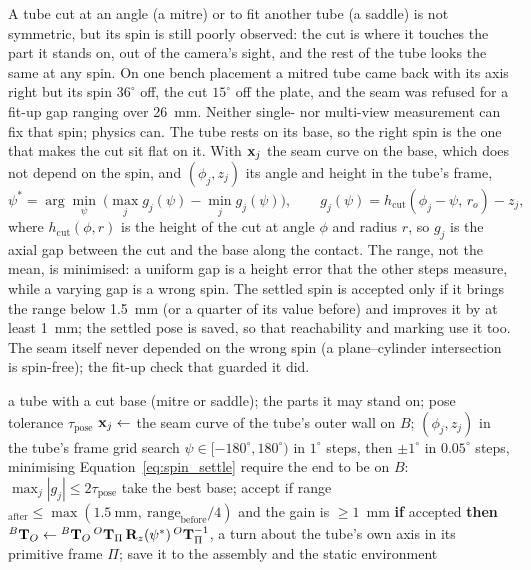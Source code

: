 A tube cut at an angle (a mitre) or to fit another tube (a saddle) is not symmetric, but its spin is
still poorly observed: the cut is where it touches the part it stands on, out of the camera's sight,
and the rest of the tube looks the same at any spin. On one bench placement a mitred tube came back
with its axis right but its spin $36^\circ$ off, the cut $15^\circ$ off the plate, and the seam was
refused for a fit-up gap ranging over 26~mm. Neither single- nor multi-view measurement can fix
that spin; physics can. The tube rests on its base, so the right spin is the one that makes the cut
sit flat on it. With $\mathbf{x}_j$ the seam curve on the base, which does not depend on the spin, and
$(\phi_j,z_j)$ its angle and height in the tube's frame,
\begin{equation}
\psi^{*} = \arg\min_{\psi}\ \Big(\max_{j} g_j(\psi) - \min_{j} g_j(\psi)\Big),
\qquad g_j(\psi)=h_{\mathrm{cut}}(\phi_j-\psi,\,r_o)-z_j,
\label{eq:spin_settle}
\end{equation}
where $h_{\mathrm{cut}}(\phi,r)$ is the height of the cut at angle $\phi$ and radius $r$, so
$g_j$ is the axial gap between the cut and the base along the contact. The range, not the mean, is
minimised: a uniform gap is a height error that the other steps measure, while a varying gap is a
wrong spin. The settled spin is accepted only if it brings the range below 1.5~mm (or a quarter of
its value before) and improves it by at least 1~mm; the settled pose is saved, so that reachability
and marking use it too. The seam itself never depended on the wrong spin (a plane--cylinder
intersection is spin-free); the fit-up check that guarded it did.

\begin{algorithm}[htbp]
\caption{Settling the spin of a cut tube on what it stands on}
\label{alg:spin_settle}
\begin{algorithmic}[1]
\REQUIRE a tube with a cut base (mitre or saddle); the parts it may stand on; pose tolerance $\tau_{\mathrm{pose}}$
  \STATE $\mathbf{x}_j\gets$ the seam curve of the tube's outer wall on $B$; $(\phi_j,z_j)$ in the tube's frame
  \STATE grid search $\psi\in[-180^\circ,180^\circ)$ in $1^\circ$ steps, then $\pm1^\circ$ in $0.05^\circ$ steps, minimising Equation~\ref{eq:spin_settle}
  \STATE require the end to be on $B$: $\max_j|g_j|\le2\tau_{\mathrm{pose}}$
\ENDFOR
\STATE take the best base; accept if range$_{\mathrm{after}}\le\max(1.5~\mathrm{mm},\ \mathrm{range}_{\mathrm{before}}/4)$ and the gain is $\ge1$~mm
\STATE \textbf{if} accepted \textbf{then} ${}^{B}\mathbf{T}_{O}\gets{}^{B}\mathbf{T}_{O}\,{}^{O}\mathbf{T}_{\Pi}\,\mathbf{R}_z(\psi^{*})\,{}^{O}\mathbf{T}_{\Pi}^{-1}$, a turn about the tube's own axis in its primitive frame $\Pi$; save it to the assembly and the static environment
\end{algorithmic}
\end{algorithm}

